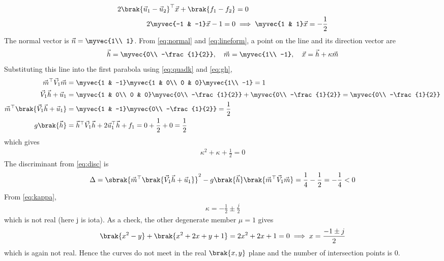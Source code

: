 \begin{enumerate}[label=\thesubsection.\arabic*, ref=\thesubsection.\theenumi, itemsep=0pt, leftmargin=*]
\begin{align}
2\brak{\vec{u}_1 - \vec{u}_2}^\top\vec{x} + \brak{f_1 - f_2} &= 0\\
2\myvec{-1 & -1}\vec{x} - 1 = 0 &\implies \myvec{1 & 1}\vec{x} = -\frac{1}{2}
\end{align}
The normal vector is $\vec{n} = \myvec{1\\ 1}$. From \eqref{eq:normal} and \eqref{eq:lineform}, a point on the line and its direction vector are
\begin{align}
\vec{h} = \myvec{0\\ -\frac{1}{2}},\quad \vec{m} = \myvec{1\\ -1},\quad \vec{x} = \vec{h} + \kappa\vec{m}
\end{align}
Substituting this line into the first parabola using \eqref{eq:quadk} and \eqref{eq:gh},
\begin{align}
\vec{m}^\top\vec{V}_1\vec{m} &= \myvec{1 & -1}\myvec{1 & 0\\ 0 & 0}\myvec{1\\ -1} = 1\\
\vec{V}_1\vec{h} + \vec{u}_1 &= \myvec{1 & 0\\ 0 & 0}\myvec{0\\ -\frac{1}{2}} + \myvec{0\\ -\frac{1}{2}} = \myvec{0\\ -\frac{1}{2}}\\
\vec{m}^\top\brak{\vec{V}_1\vec{h} + \vec{u}_1} &= \myvec{1 & -1}\myvec{0\\ -\frac{1}{2}} = \frac{1}{2}\\
g\brak{\vec{h}} &= \vec{h}^\top\vec{V}_1\vec{h} + 2\vec{u}_1^\top\vec{h} + f_1 = 0 + \frac{1}{2} + 0 = \frac{1}{2}
\end{align}
which gives
\begin{align}
\kappa^2 + \kappa + \frac{1}{2} = 0
\end{align}
The discriminant from \eqref{eq:disc} is
\begin{align}
\Delta = \sbrak{\vec{m}^\top\brak{\vec{V}_1\vec{h} + \vec{u}_1}}^2 - g\brak{\vec{h}}\brak{\vec{m}^\top\vec{V}_1\vec{m}} = \frac{1}{4} - \frac{1}{2} = -\frac{1}{4} < 0
\end{align}
From \eqref{eq:kappa},
\begin{align}
\kappa = -\frac{1}{2} \pm \frac{j}{2}
\end{align}
which is not real (here j is iota). As a check, the other degenerate member $\mu = 1$ gives
\begin{align}
\brak{x^2 - y} + \brak{x^2 + 2x + y + 1} = 2x^2 + 2x + 1 = 0 \implies x = \frac{-1 \pm j}{2}
\end{align}
which is again not real. Hence the curves do not meet in the real $\brak{x,y}$ plane and the number of intersection points is $0$.


\end{enumerate}
